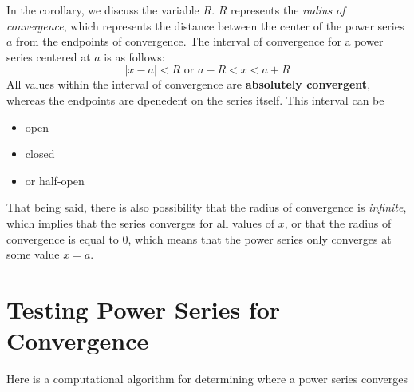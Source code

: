 In the corollary, we discuss the variable $ R $. $ R $
represents the \textit{radius of convergence}, which
represents the distance between the center of the
power series $ a $ from the endpoints of convergence. The
interval of convergence for a power series centered
at $ a $ is as follows:
\[ | x - a | < R \textrm{ or } a - R < x < a + R \]
All values within the interval of convergence
are \textbf{absolutely convergent}, whereas the endpoints
are dpenedent on the series itself. This interval can be
\begin{itemize}
  \item open
  \item closed
  \item or half-open
\end{itemize}
That being said, there is also possibility that the
radius of convergence is \textit{infinite}, which
implies that the series converges for all values of
$ x $, or that the radius of convergence is equal to 0,
which means that the power series only converges at some
value $ x = a $.


\section{Testing Power Series for Convergence}
Here is a computational algorithm for determining where
a power series converges
\begin{center}
\end{center}



